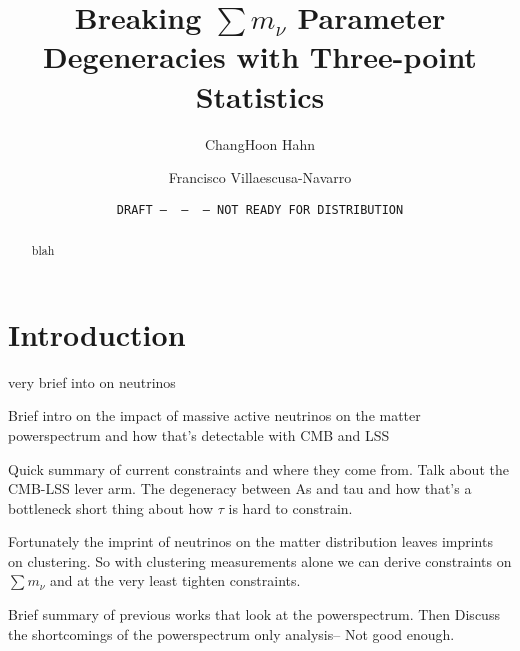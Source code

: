 \documentclass[12pt, letterpaper, preprint]{aastex62}
\newcommand{\smnu}{\sum m_\nu}
\begin{document}
\sloppy\sloppypar\frenchspacing 

\title{Breaking $\smnu$ Parameter Degeneracies with Three-point Statistics} 
\date{\texttt{DRAFT~---~\githash~---~\gitdate~---~NOT READY FOR DISTRIBUTION}}


%
%

\author{ChangHoon Hahn}

\author{Francisco Villaescusa-Navarro} 

\begin{abstract}
blah 
\end{abstract}


\section{Introduction}
very brief into on neutrinos

Brief intro on the impact of massive active neutrinos on the matter powerspectrum 
and how that's detectable with CMB and LSS


Quick summary of current constraints and where they come from. Talk about the 
CMB-LSS lever arm. The degeneracy between As and tau and how that's a bottleneck
short thing about how $\tau$ is hard to constrain.

Fortunately the imprint of neutrinos on the matter distribution leaves imprints
on clustering. So with clustering measurements alone we can derive constraints 
on $\smnu$ and at the very least tighten constraints.  

Brief summary of previous works that look at the powerspectrum. Then Discuss the 
shortcomings of the powerspectrum only analysis-- Not good enough. 
\end{document}
